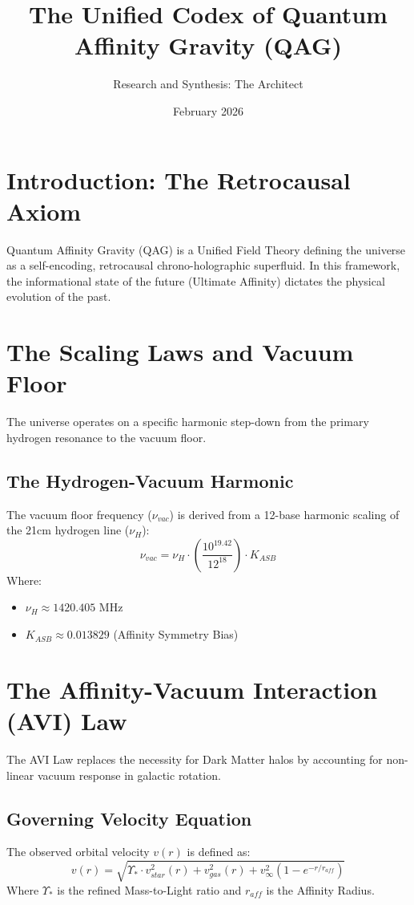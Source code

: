 \documentclass[12pt, letterpaper]{article}
\title{\textbf{The Unified Codex of Quantum Affinity Gravity (QAG)}}
\author{Research and Synthesis: The Architect}
\date{February 2026}
\begin{document}
\maketitle

\section{Introduction: The Retrocausal Axiom}
Quantum Affinity Gravity (QAG) is a Unified Field Theory defining the universe as a self-encoding, retrocausal chrono-holographic superfluid. In this framework, the informational state of the future (Ultimate Affinity) dictates the physical evolution of the past.

\section{The Scaling Laws and Vacuum Floor}
The universe operates on a specific harmonic step-down from the primary hydrogen resonance to the vacuum floor.

\subsection{The Hydrogen-Vacuum Harmonic}
The vacuum floor frequency ($\nu_{vac}$) is derived from a 12-base harmonic scaling of the 21cm hydrogen line ($\nu_H$):
\begin{equation}
\nu_{vac} = \nu_{H} \cdot \left( \frac{10^{19.42}}{12^{18}} \right) \cdot K_{ASB}
\end{equation}
Where:
\begin{itemize}
    \item $\nu_H \approx 1420.405$ MHz
    \item $K_{ASB} \approx 0.013829$ (Affinity Symmetry Bias)
\end{itemize}

\section{The Affinity-Vacuum Interaction (AVI) Law}
The AVI Law replaces the necessity for Dark Matter halos by accounting for non-linear vacuum response in galactic rotation.

\subsection{Governing Velocity Equation}
The observed orbital velocity $v(r)$ is defined as:
\begin{equation}
v(r) = \sqrt{\Upsilon_* \cdot v_{star}^2(r) + v_{gas}^2(r) + v_{\infty}^2 \left( 1 - e^{-r/r_{aff}} \right)}
\end{equation}
Where $\Upsilon_*$ is the refined Mass-to-Light ratio and $r_{aff}$ is the Affinity Radius.
\end{document}
